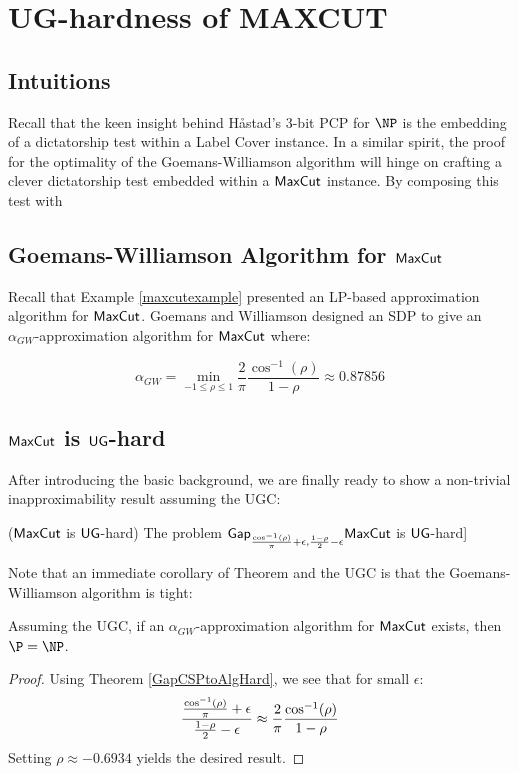 \newcommand{\GapMaxCut}{\mathsf{Gap}_{\GWConstant + \epsilon, \frac{1-\rho}{2} - \epsilon}\mathsf{MaxCut}}
\newcommand{\ULC}{\mathsf{UniqueLC}(m)}
\newcommand{\GapULC}{\mathsf{GapUniqueLC}(m)}
\newcommand{\GapDeltaULC}{\mathsf{Gap}_{\delta, 1-\delta}\ULC}

\section{UG-hardness of MAXCUT}
\subsection{Intuitions}
Recall that the keen insight behind H\aa stad's 3-bit PCP for $\NP$ is the embedding of a dictatorship test within a Label Cover instance. In a similar spirit, the proof for the optimality of the Goemans-Williamson algorithm will hinge on crafting a clever dictatorship test embedded within a $\mathsf{MaxCut}$ instance. By composing this test with

\subsection{Goemans-Williamson Algorithm for $\mathsf{MaxCut}$}
Recall that Example \ref{maxcutexample} presented an LP-based approximation algorithm for $\mathsf{MaxCut}$. Goemans and Williamson \cite{goemans1995improved} designed an SDP to give an $\alpha_{GW}$-approximation algorithm for $\mathsf{MaxCut}$ where:

\begin{equation}
  \alpha_{GW} = \min_{-1 \leq \rho \leq 1} \frac{2}{\pi}\frac{\cos^{-1}(\rho)}{1 - \rho} \approx 0.87856
\end{equation}



\subsection{$\mathsf{MaxCut}$ is $\mathsf{UG}$-hard}
After introducing the basic background, we are finally ready to show a non-trivial inapproximability result assuming the UGC:

\begin{theorem} \label{maxcutughard} ($\mathsf{MaxCut}$ is $\mathsf{UG}$-hard) The problem $\GapMaxCut$ is $\mathsf{UG}$-hard]
\end{theorem}
Note that an immediate corollary of Theorem and the UGC is that the Goemans-Williamson algorithm is tight:

\begin{corollary}
Assuming the UGC, if an $\alpha_{GW}$-approximation algorithm for $\mathsf{MaxCut}$ exists, then $\P = \NP$.
\end{corollary}
%
\begin{proof}
Using Theorem \ref{GapCSPtoAlgHard}, we see that for small $\epsilon$:
\[ \frac{\frac{\cos^{-1}(\rho)}{\pi} + \epsilon}{\frac{1-\rho}{2} - \epsilon} \approx \frac{2}{\pi}\frac{\cos^{-1}(\rho)}{1 - \rho} \]
Setting $\rho \approx -0.6934$ yields the desired result.
\end{proof}

